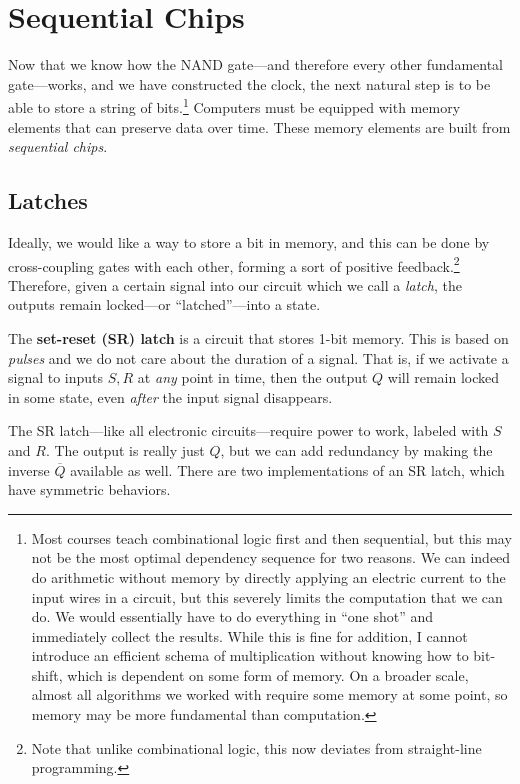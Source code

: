 \section{Sequential Chips}

  Now that we know how the NAND gate---and therefore every other fundamental gate---works, and we have constructed the clock, the next natural step is to be able to store a string of bits.\footnote{Most courses teach combinational logic first and then sequential, but this may not be the most optimal dependency sequence for two reasons. We can indeed do arithmetic without memory by directly applying an electric current to the input wires in a circuit, but this severely limits the computation that we can do. We would essentially have to do everything in ``one shot'' and immediately collect the results. While this is fine for addition, I cannot introduce an efficient schema of multiplication without knowing how to bit-shift, which is dependent on some form of memory. On a broader scale, almost all algorithms we worked with require some memory at some point, so memory may be more fundamental than computation.} Computers must be equipped with memory elements that can preserve data over time. These memory elements are built from \textit{sequential chips}. 

\subsection{Latches}

  Ideally, we would like a way to store a bit in memory, and this can be done by cross-coupling gates with each other, forming a sort of positive feedback.\footnote{Note that unlike combinational logic, this now deviates from straight-line programming.} Therefore, given a certain signal into our circuit which we call a \textit{latch}, the outputs remain locked---or ``latched''---into a state. 

  \begin{definition}[SR Latch]
    The \textbf{set-reset (SR) latch} is a circuit that stores 1-bit memory. This is based on \textit{pulses} and we do not care about the duration of a signal. That is, if we activate a signal to inputs $S, R$ at \textit{any} point in time, then the output $Q$ will remain locked in some state, even \textit{after} the input signal disappears. 
  \end{definition}

  The SR latch---like all electronic circuits---require power to work, labeled with $S$ and $R$. The output is really just $Q$, but we can add redundancy by making the inverse $\overline{Q}$ available as well. There are two implementations of an SR latch, which have symmetric behaviors. 


